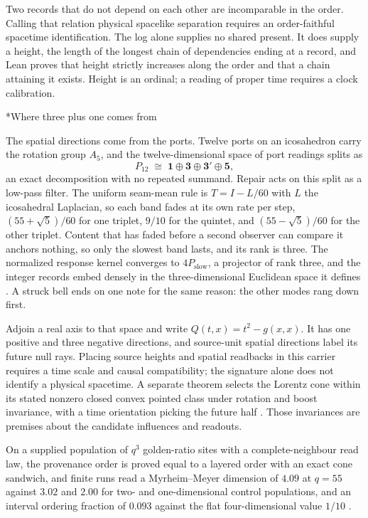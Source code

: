 \documentclass[12pt]{article}
\makeatletter
\renewcommand\section{\@startsection{section}{1}{\z@}{-1.4ex plus -0.4ex minus -0.2ex}{0.7ex plus 0.1ex}{\normalfont\large\bfseries}}
\makeatother
\begin{document}
\begin{doublespace}
Two records that do not depend on each other are incomparable in the order. Calling that relation physical spacelike separation requires an order-faithful spacetime identification. The log alone supplies no shared present. It does supply a height, the length of the longest chain of dependencies ending at a record, and Lean proves that height strictly increases along the order and that a chain attaining it exists. Height is an ordinal; a reading of proper time requires a clock calibration.

\section*{Where three plus one comes from}

The spatial directions come from the ports. Twelve ports on an icosahedron carry the rotation group $A_5$, and the twelve-dimensional space of port readings splits as
\begin{equation}
P_{12}\;\cong\;\mathbf{1}\oplus\mathbf{3}\oplus\mathbf{3}'\oplus\mathbf{5},
\end{equation}
an exact decomposition with no repeated summand. Repair acts on this split as a low-pass filter. The uniform seam-mean rule is $T = I - L/60$ with $L$ the icosahedral Laplacian, so each band fades at its own rate per step, $(55+\sqrt5)/60$ for one triplet, $9/10$ for the quintet, and $(55-\sqrt5)/60$ for the other triplet. Content that has faded before a second observer can compare it anchors nothing, so only the slowest band lasts, and its rank is three. The normalized response kernel converges to $4P_{\mathrm{slow}}$, a projector of rank three, and the integer records embed densely in the three-dimensional Euclidean space it defines \cite{ophflagship}. A struck bell ends on one note for the same reason: the other modes rang down first.

Adjoin a real axis to that space and write $Q(t,x) = t^2 - g(x,x)$. It has one positive and three negative directions, and source-unit spatial directions label its future null rays. Placing source heights and spatial readbacks in this carrier requires a time scale and causal compatibility; the signature alone does not identify a physical spacetime. A separate theorem selects the Lorentz cone within its stated nonzero closed convex pointed class under rotation and boost invariance, with a time orientation picking the future half \cite{ophEinstein}. Those invariances are premises about the candidate influences and readouts.

On a supplied population of $q^3$ golden-ratio sites with a complete-neighbour read law, the provenance order is proved equal to a layered order with an exact cone sandwich, and finite runs read a Myrheim--Meyer dimension of $4.09$ at $q=55$ against $3.02$ and $2.00$ for two- and one-dimensional control populations, and an interval ordering fraction of $0.093$ against the flat four-dimensional value $1/10$ \cite{ophEinstein}.


\end{doublespace}
\end{document}
